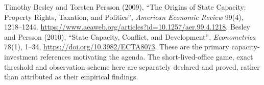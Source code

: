 \documentclass[11pt,a4paper]{article}
\theoremstyle{definition}
\theoremstyle{remark}
\begin{document}
Timothy Besley and Torsten Persson (2009), ``The Origins of State Capacity: Property Rights, Taxation, and Politics'', \emph{American Economic Review} 99(4), 1218--1244. \url{https://www.aeaweb.org/articles?id=10.1257/aer.99.4.1218}. Besley and Persson (2010), ``State Capacity, Conflict, and Development'', \emph{Econometrica} 78(1), 1--34, \url{https://doi.org/10.3982/ECTA8073}. These are the primary capacity-investment references motivating the agenda. The short-lived-office game, exact threshold and observation scheme here are separately declared and proved, rather than attributed as their empirical findings.
\end{document}
